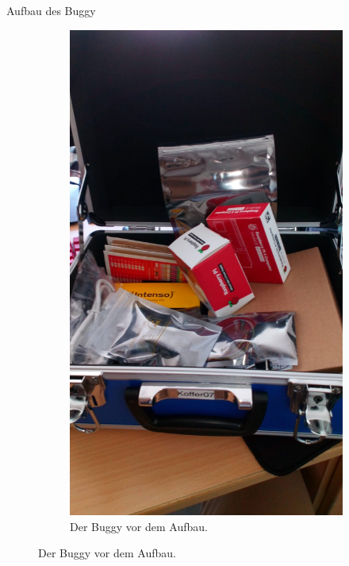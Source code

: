\documentclass[12pt]{report}
\begin{document}

\begin{section}{Aufbau des Buggy}

\begin{figure}[h!]
  \centering
  \captionsetup[subfigure]{labelformat=empty}
  \begin{subfigure}{0.45\linewidth}
    \includegraphics[width=\linewidth]{lernportfolio_assets/Buggy_Koffer.jpeg}
    \caption{Der Buggy vor dem Aufbau.}
  \end{subfigure}

\end{figure}
\end{section}
\end{document}
